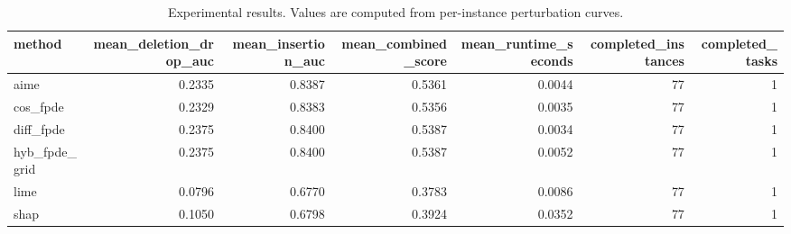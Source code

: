 \begin{table}[t]
\caption{Experimental results. Values are computed from per-instance perturbation curves.}
\label{tab:main_results_computed}
\centering
\begin{tabular}{lrrrrrr}
\toprule
method & mean\_deletion\_drop\_auc & mean\_insertion\_auc & mean\_combined\_score & mean\_runtime\_seconds & completed\_instances & completed\_tasks \\
\midrule
aime & 0.2335 & 0.8387 & 0.5361 & 0.0044 & 77 & 1 \\
cos\_fpde & 0.2329 & 0.8383 & 0.5356 & 0.0035 & 77 & 1 \\
diff\_fpde & 0.2375 & 0.8400 & 0.5387 & 0.0034 & 77 & 1 \\
hyb\_fpde\_grid & 0.2375 & 0.8400 & 0.5387 & 0.0052 & 77 & 1 \\
lime & 0.0796 & 0.6770 & 0.3783 & 0.0086 & 77 & 1 \\
shap & 0.1050 & 0.6798 & 0.3924 & 0.0352 & 77 & 1 \\
\bottomrule
\end{tabular}

\end{table}
